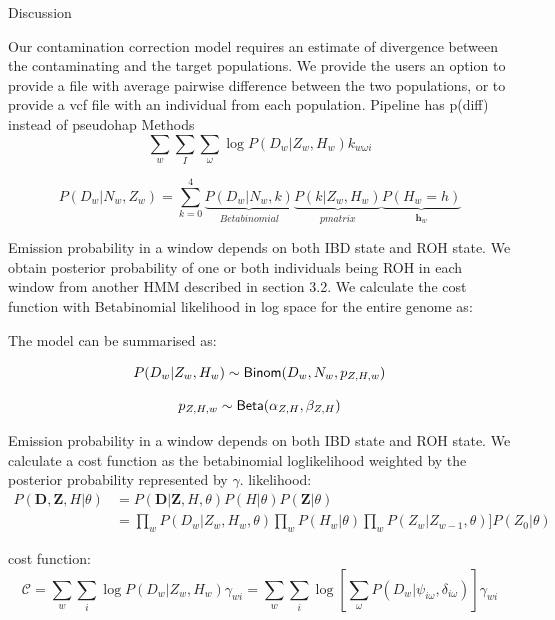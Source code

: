 \documentclass[12pt, letterpaper]{article}
\newcommand{\BZ}{\mathbf{Z}}
\begin{document}
Discussion

Our contamination correction model requires an estimate of divergence between the contaminating and the target populations. We provide the users an option to provide a file with average pairwise difference between the two populations, or to provide a vcf file with an individual from each population. 
Pipeline has p(diff) instead of pseudohap
Methods
$$\sum_{w} \sum_{I}\sum_\omega \log P(D_{w}|Z_w, H_w)k_{w\omega i}$$



$$P(D_w | N_w, Z_w) = \sum_{k=0}^4 
\underbrace{P(D_w | N_w, k)}_{Betabinomial}
\underbrace{P(k | Z_w, H_w)}_{p matrix}
\underbrace{P(H_w =h)}_{\mathbf{h}_w}
$$

Emission probability in a window depends on both IBD state and ROH state. We obtain posterior probability of one or both individuals being ROH in each window from another HMM described in section 3.2. We calculate the cost function with Betabinomial likelihood in log space for the entire genome as:

The model can be summarised as:

\begin{equation}\label{eq:6}
P(D_w|Z_w,H_w) \sim {\sf Binom}(D_w, N_w, p_{Z,H,w})
\end{equation}

\begin{equation}\label{eq:7}
p_{Z,H,w} \sim {\sf Beta}(\alpha_{Z,H}, \beta_{Z,H})
\end{equation}

Emission probability in a window depends on both IBD state and ROH state. We calculate a cost function as the betabinomial loglikelihood weighted by the posterior probability represented by $\gamma$.
likelihood:
\begin{align}
P(\mathbf{D},\BZ, H|\theta) &= P(\mathbf{D}|\mathbf{Z},H,\theta) P(H |\theta) P(\BZ|\theta)\nonumber\\
&= \prod_{w}  P(D_w|Z_w,  H_w, \theta) \prod_w P(H_w | \theta) \prod_{w} P(Z_w|Z_{w-1}, \theta)] P(Z_0| \theta) 
\end{align}

cost function:
\begin{equation}
    \mathcal{C} = 
       \sum_{w} \sum_{i} \log P(D_{w}|Z_w, H_w)\gamma_{wi}=
    \sum_{w} \sum_{i} 
    \log \left[\sum_{\omega}P(D_{w}|\psi_{i\omega},\delta_{i\omega}) \right] \gamma_{wi}
\end{equation}
\end{document}
